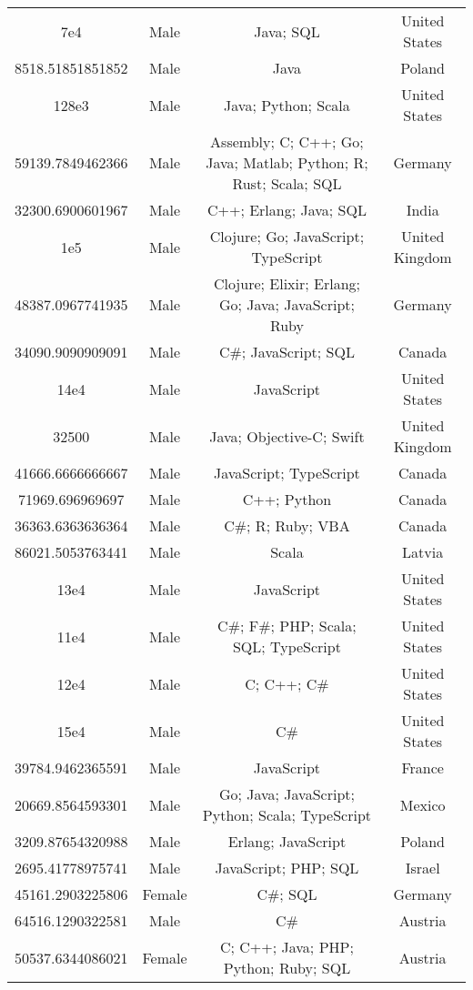 \begin{center}
\begin{tabular}{ |c|c|c|c| }
7e4  &  Male  &  Java; SQL  &  United States  \\ 
8518.51851851852  &  Male  &  Java  &  Poland  \\ 
128e3  &  Male  &  Java; Python; Scala  &  United States  \\ 
59139.7849462366  &  Male  &  Assembly; C; C++; Go; Java; Matlab; Python; R; Rust; Scala; SQL  &  Germany  \\ 
32300.6900601967  &  Male  &  C++; Erlang; Java; SQL  &  India  \\ 
1e5  &  Male  &  Clojure; Go; JavaScript; TypeScript  &  United Kingdom  \\ 
48387.0967741935  &  Male  &  Clojure; Elixir; Erlang; Go; Java; JavaScript; Ruby  &  Germany  \\ 
34090.9090909091  &  Male  &  C\#; JavaScript; SQL  &  Canada  \\ 
14e4  &  Male  &  JavaScript  &  United States  \\ 
32500  &  Male  &  Java; Objective-C; Swift  &  United Kingdom  \\ 
41666.6666666667  &  Male  &  JavaScript; TypeScript  &  Canada  \\ 
71969.696969697  &  Male  &  C++; Python  &  Canada  \\ 
36363.6363636364  &  Male  &  C\#; R; Ruby; VBA  &  Canada  \\ 
86021.5053763441  &  Male  &  Scala  &  Latvia  \\ 
13e4  &  Male  &  JavaScript  &  United States  \\ 
11e4  &  Male  &  C\#; F\#; PHP; Scala; SQL; TypeScript  &  United States  \\ 
12e4  &  Male  &  C; C++; C\#  &  United States  \\ 
15e4  &  Male  &  C\#  &  United States  \\ 
39784.9462365591  &  Male  &  JavaScript  &  France  \\ 
20669.8564593301  &  Male  &  Go; Java; JavaScript; Python; Scala; TypeScript  &  Mexico  \\ 
3209.87654320988  &  Male  &  Erlang; JavaScript  &  Poland  \\ 
2695.41778975741  &  Male  &  JavaScript; PHP; SQL  &  Israel  \\ 
45161.2903225806  &  Female  &  C\#; SQL  &  Germany  \\ 
64516.1290322581  &  Male  &  C\#  &  Austria  \\ 
50537.6344086021  &  Female  &  C; C++; Java; PHP; Python; Ruby; SQL  &  Austria  \\ 

\end{tabular}
\end{center}
